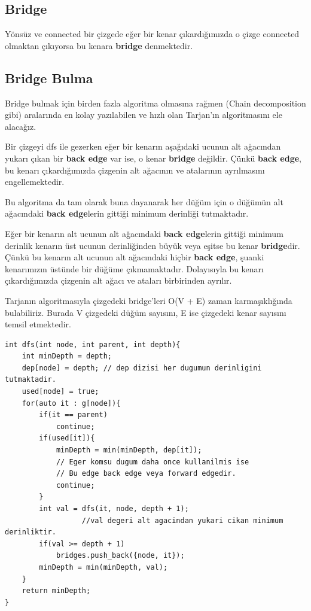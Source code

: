\documentclass[12pt]{article}
\begin{document}
    \subsection{Bridge}
    Yönsüz ve connected bir çizgede eğer bir kenar çıkardığımızda o çizge connected olmaktan çıkıyorsa bu kenara \textbf{bridge} denmektedir.

    \subsection{Bridge Bulma}

    Bridge bulmak için birden fazla algoritma olmasına rağmen (Chain decomposition gibi) aralarında en kolay yazılabilen ve hızlı olan Tarjan'ın algoritmasını ele alacağız.
    
    Bir çizgeyi dfs ile gezerken eğer bir kenarın aşağıdaki ucunun alt ağacından yukarı çıkan bir \textbf{back edge} var ise, o kenar \textbf{bridge} değildir. Çünkü  \textbf{back edge}, bu kenarı çıkardığımızda çizgenin alt ağacının ve atalarının ayrılmasını engellemektedir.

    Bu algoritma da tam olarak buna dayanarak her düğüm için o düğümün alt ağacındaki \textbf{back edge}lerin gittiği minimum derinliği tutmaktadır. 
    
    Eğer bir kenarın alt ucunun alt ağacındaki \textbf{back edge}lerin gittiği minimum derinlik kenarın üst ucunun derinliğinden büyük veya eşitse bu kenar \textbf{bridge}dir. Çünkü bu kenarın alt ucunun alt ağacındaki hiçbir \textbf{back edge}, şuanki kenarımızın üstünde bir düğüme çıkmamaktadır. Dolayısıyla bu kenarı çıkardığımızda çizgenin alt ağacı ve ataları birbirinden ayrılır.
    
    Tarjanın algoritmasıyla çizgedeki bridge'leri O(V + E) zaman karmaşıklığında bulabiliriz. Burada V çizgedeki düğüm sayısını, E ise çizgedeki kenar sayısını temsil etmektedir.

   \cleardoublepage 

    \begin{verbatim}
int dfs(int node, int parent, int depth){
	int minDepth = depth;
	dep[node] = depth; // dep dizisi her dugumun derinligini tutmaktadir.
	used[node] = true;
	for(auto it : g[node]){
		if(it == parent)
			continue;
		if(used[it]){
			minDepth = min(minDepth, dep[it]);
			// Eger komsu dugum daha once kullanilmis ise
			// Bu edge back edge veya forward edgedir.
			continue;
		}
		int val = dfs(it, node, depth + 1);
                  //val degeri alt agacindan yukari cikan minimum derinliktir.
		if(val >= depth + 1)
			bridges.push_back({node, it});
		minDepth = min(minDepth, val);
	}
	return minDepth;
}
    \end{verbatim}
\end{document}
